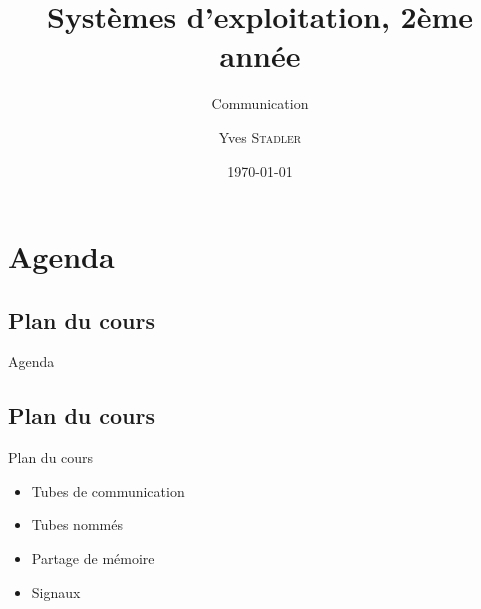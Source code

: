 
\title{Systèmes d'exploitation, 2ème année}
\subtitle{Communication}

\author{Yves \textsc{Stadler}}

\date{\today}




\begin{frame}
\titlepage
\end{frame}

\def\sectitle{Agenda}
\section{\sectitle}
\def\subsectitle{Plan du cours}
\subsection{\subsectitle}

\begin{frame}{\sectitle}
\def\subsectitle{Plan du cours}
\subsection{\subsectitle}
\begin{block}{\subsectitle}
\begin{itemize}
\item Tubes de communication
\item Tubes nommés
\item Partage de mémoire
\item Signaux
\end{itemize}
\end{block}
\end{frame}

\def\sectitle{Motivations}
